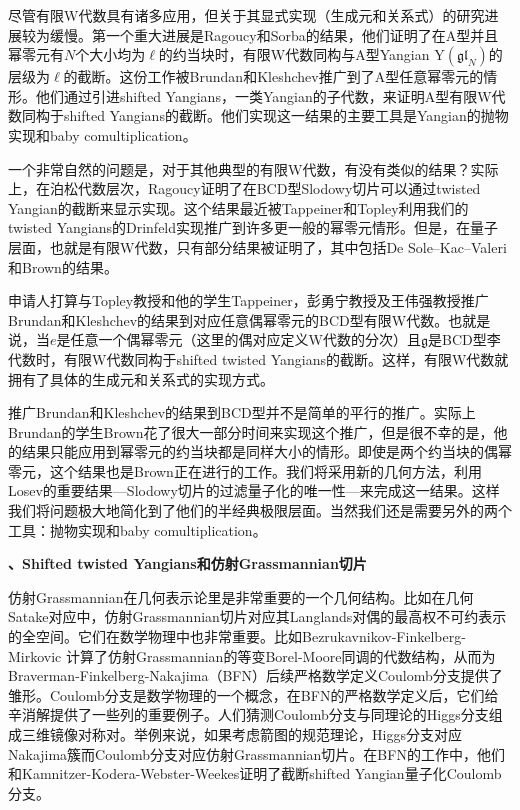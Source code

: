 \documentclass[12pt,UTF8,AutoFakeBold=4,a4paper]{ctexart}
\begin{document}
尽管有限W代数具有诸多应用，但关于其显式实现（生成元和关系式）的研究进展较为缓慢。第一个重大进展是Ragoucy和Sorba的结果，他们证明了在A型并且幂零元有$N$个大小均为$\ell$的约当块时，有限W代数同构与A型Yangian $\mathrm{Y}(\mathfrak{gl}_N)$的层级为$\ell$的截断。这份工作被Brundan和Kleshchev推广到了A型任意幂零元的情形。他们通过引进shifted Yangians，一类Yangian的子代数，来证明A型有限W代数同构于shifted Yangians的截断。他们实现这一结果的主要工具是Yangian的抛物实现和baby comultiplication。

一个非常自然的问题是，对于其他典型的有限W代数，有没有类似的结果？实际上，在泊松代数层次，Ragoucy证明了在BCD型Slodowy切片可以通过twisted Yangian的截断来显示实现。这个结果最近被Tappeiner和Topley利用我们的twisted Yangians的Drinfeld实现推广到许多更一般的幂零元情形。但是，在量子层面，也就是有限W代数，只有部分结果被证明了，其中包括De Sole–Kac–Valeri和Brown的结果。

申请人打算与Topley教授和他的学生Tappeiner，彭勇宁教授及王伟强教授推广Brundan和Kleshchev的结果到对应任意偶幂零元的BCD型有限W代数。也就是说，当$e$是任意一个偶幂零元（这里的偶对应定义W代数的分次）且$\mathfrak g$是BCD型李代数时，有限W代数同构于shifted twisted Yangians的截断。这样，有限W代数就拥有了具体的生成元和关系式的实现方式。

推广Brundan和Kleshchev的结果到BCD型并不是简单的平行的推广。实际上Brundan的学生Brown花了很大一部分时间来实现这个推广，但是很不幸的是，他的结果只能应用到幂零元的约当块都是同样大小的情形。即使是两个约当块的偶幂零元，这个结果也是Brown正在进行的工作。我们将采用新的几何方法，利用Losev的重要结果---Slodowy切片的过滤量子化的唯一性---来完成这一结果。这样我们将问题极大地简化到了他们的半经典极限层面。当然我们还是需要另外的两个工具：抛物实现和baby comultiplication。

\medskip

\textbf{、Shifted twisted Yangians和仿射Grassmannian切片}

仿射Grassmannian在几何表示论里是非常重要的一个几何结构。比如在几何Satake对应中，仿射Grassmannian切片对应其Langlands对偶的最高权不可约表示的全空间。它们在数学物理中也非常重要。比如Bezrukavnikov-Finkelberg-Mirkovic 计算了仿射Grassmannian的等变Borel-Moore同调的代数结构，从而为Braverman-Finkelberg-Nakajima（BFN）后续严格数学定义Coulomb分支提供了雏形。Coulomb分支是数学物理的一个概念，在BFN的严格数学定义后，它们给辛消解提供了一些列的重要例子。人们猜测Coulomb分支与同理论的Higgs分支组成三维镜像对称对。举例来说，如果考虑箭图的规范理论，Higgs分支对应Nakajima簇而Coulomb分支对应仿射Grassmannian切片。在BFN的工作中，他们和Kamnitzer-Kodera-Webster-Weekes证明了截断shifted Yangian量子化Coulomb分支。
\end{document}
